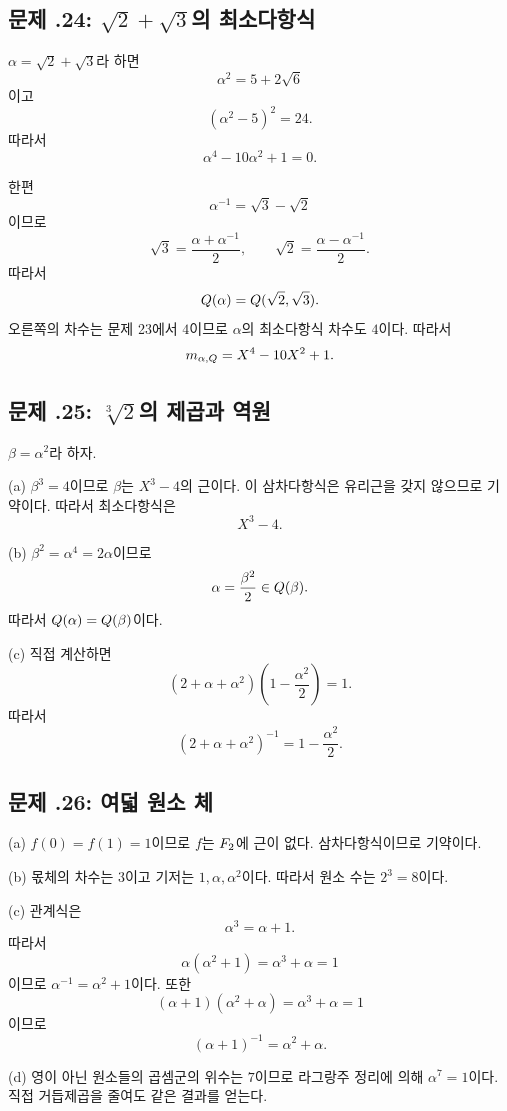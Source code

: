 \subsection*{문제 \thechapter.24: $\sqrt2+\sqrt3$의 최소다항식}

\begin{solution}
$\alpha=\sqrt2+\sqrt3$라 하면
\[
  \alpha^2=5+2\sqrt6
\]
이고
\[
  (\alpha^2-5)^2=24.
\]
따라서
\[
  \alpha^4-10\alpha^2+1=0.
\]

한편
\[
  \alpha^{-1}=\sqrt3-\sqrt2
\]
이므로
\[
  \sqrt3=\frac{\alpha+\alpha^{-1}}2,
  \qquad
  \sqrt2=\frac{\alpha-\alpha^{-1}}2.
\]
따라서
\[
  Q(\alpha)=Q(\sqrt2,\sqrt3).
\]
오른쪽의 차수는 문제 23에서 $4$이므로 $\alpha$의 최소다항식 차수도 $4$이다. 따라서
\[
  m_{\alpha,Q}=X^4-10X^2+1.
\]
\end{solution}

\subsection*{문제 \thechapter.25: $\sqrt[3]{2}$의 제곱과 역원}

\begin{solution}
$\beta=\alpha^2$라 하자.

(a) $\beta^3=4$이므로 $\beta$는 $X^3-4$의 근이다. 이 삼차다항식은 유리근을 갖지 않으므로 기약이다. 따라서 최소다항식은
\[
  X^3-4.
\]

(b) $\beta^2=\alpha^4=2\alpha$이므로
\[
  \alpha=\frac{\beta^2}{2}\in Q(\beta).
\]
따라서 $Q(\alpha)=Q(\beta)$이다.

(c) 직접 계산하면
\[
  (2+\alpha+\alpha^2)\left(1-\frac{\alpha^2}{2}\right)=1.
\]
따라서
\[
  (2+\alpha+\alpha^2)^{-1}=1-\frac{\alpha^2}{2}.
\]
\end{solution}

\subsection*{문제 \thechapter.26: 여덟 원소 체}

\begin{solution}
(a) $f(0)=f(1)=1$이므로 $f$는 $F_2$에 근이 없다. 삼차다항식이므로 기약이다.

(b) 몫체의 차수는 $3$이고 기저는 $1,\alpha,\alpha^2$이다. 따라서 원소 수는 $2^3=8$이다.

(c) 관계식은
\[
  \alpha^3=\alpha+1.
\]
따라서
\[
  \alpha(\alpha^2+1)=\alpha^3+\alpha=1
\]
이므로 $\alpha^{-1}=\alpha^2+1$이다. 또한
\[
  (\alpha+1)(\alpha^2+\alpha)=\alpha^3+\alpha=1
\]
이므로
\[
  (\alpha+1)^{-1}=\alpha^2+\alpha.
\]

(d) 영이 아닌 원소들의 곱셈군의 위수는 $7$이므로 라그랑주 정리에 의해 $\alpha^7=1$이다. 직접 거듭제곱을 줄여도 같은 결과를 얻는다.
\end{solution}

